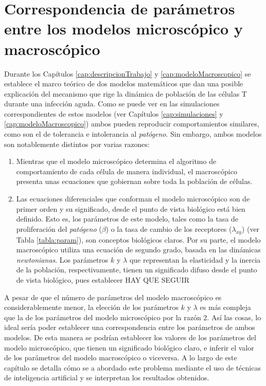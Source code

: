 \chapter{Correspondencia de parámetros entre los modelos microscópico y macroscópico}
\label{cap:redNeuronal}

Durante los Capítulos \ref{cap:descripcionTrabajo} y \ref{cap:modeloMacroscopico} se establece el marco teórico de dos modelos matemáticos que dan una posible explicación del mecanismo que rige la dinámica de población de las células T durante una infección aguda. Como se puede ver en las simulaciones correspondientes de estos modelos (ver Capítulos \ref{cap:simulaciones} y \ref{cap:modeloMacroscopico}) ambos pueden reproducir comportamientos similares, como son el de tolerancia e intolerancia al \textit{patógeno}. Sin embargo, ambos modelos son notablemente distintos por varias razones: 

\begin{enumerate}
	\item Mientras que el modelo microscópico determina el algoritmo de comportamiento de cada célula de manera individual, el macroscópico presenta unas ecuaciones que gobiernan sobre toda la población de células. 
	
	\item Las ecuaciones diferenciales que conforman el modelo microscópico son de primer orden y su significado, desde el punto de vista biológico está bien definido. Esto es, los parámetros de este modelo, tales como la tasa de proliferación del \textit{patógeno} ($\beta$) o la tasa de cambio de los receptores ($\lambda_{xy}$) (ver Tabla \ref{tabla:param}), son conceptos biológicos claros. Por su parte, el modelo macroscópico utiliza una ecuación de segundo grado, basada en las dinámicas \textit{newtonianas}. Los parámetros $k$ y $\lambda$ que representan la elasticidad y la inercia de la población, respectivamente, tienen un significado difuso desde el punto de vista biológico, pues establecer HAY QUE SEGUIR
	

	
\end{enumerate}

A pesar de que el número de parámetros del modelo macroscópico es considerablemente menor, la elección de los parámetros $k$ y $\lambda$ es más compleja que la de los parámetros del modelo microscópico por la razón $2$. Así las cosas, lo ideal sería poder establecer una correspondencia entre los parámetros de ambos modelos. De esta manera se podrían establecer los valores de los parámetros del modelo microscópico, que tienen un significado biológico claro, e inferir el valor de los parámetros del modelo macroscópico o viceversa. A lo largo de este capítulo se detalla cómo se a abordado este problema mediante el uso de técnicas de inteligencia artificial y se interpretan los resultados obtenidos. 



